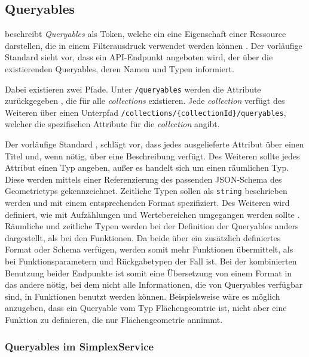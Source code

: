 \subsection{Queryables}
\label{sec:queryables}

 beschreibt \textit{Queryables} als Token, welche ein eine Eigenschaft einer Ressource darstellen, die in einem Filterausdruck verwendet werden können . Der vorläufige Standard sieht vor, dass ein \ac{API}-Endpunkt angeboten wird, der über die existierenden Queryables, deren Namen und Typen informiert.

Dabei existieren zwei Pfade. Unter \texttt{/queryables} werden die Attribute zurückgegeben , die für alle \textit{collections} existieren. Jede \textit{collection} verfügt des Weiteren über einen Unterpfad \texttt{/collections/\{collectionId\}/queryables}, welcher die spezifischen Attribute für die \textit{collection} angibt.

Der vorläufige Standard , schlägt vor, dass jedes ausgelieferte Attribut über einen Titel und, wenn nötig, über eine Beschreibung verfügt. Des Weiteren sollte jedes Attribut einen Typ angeben, außer es handelt sich um einen räumlichen Typ. Diese werden mittels einer Referenzierung des passenden \ac{JSON}-Schema des Geometrietyps gekennzeichnet. Zeitliche Typen sollen als \texttt{string} beschrieben werden und mit einem entsprechenden Format spezifiziert. Des Weiteren wird definiert, wie mit Aufzählungen und Wertebereichen umgegangen werden sollte . Räumliche und zeitliche Typen werden bei der Definition der Queryables anders dargestellt, als bei den Funktionen. Da beide über ein zusätzlich definiertes Format oder Schema verfügen, werden somit mehr Funktionen übermittelt, als bei Funktionsparametern und Rückgabetypen der Fall ist. Bei der kombinierten Benutzung beider Endpunkte ist somit eine Übersetzung von einem Format in das andere nötig, bei dem nicht alle Informationen, die von Queryables verfügbar sind, in Funktionen benutzt werden können. Beispielsweise wäre es möglich anzugeben, dass ein Queryable vom Typ Flächengeomtrie ist, nicht aber eine Funktion zu definieren, die nur Flächengeometrie annimmt.

\subsubsection{Queryables im SimplexService}

